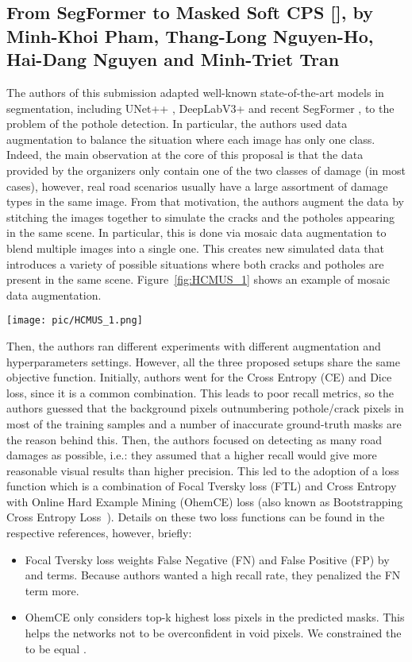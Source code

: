 \documentclass[twocolumn]{article}
\begin{document}
\subsection{From SegFormer to Masked Soft CPS [\HCMUS{}], by Minh-Khoi Pham, Thang-Long Nguyen-Ho, Hai-Dang Nguyen and Minh-Triet Tran}
The authors of this submission adapted well-known state-of-the-art models in segmentation, including UNet++ \cite{zhou2018unet++}, DeepLabV3+ \cite{chen2018encoder} and recent SegFormer \cite{xie2021segformer}, to the problem of the pothole detection. In particular, the authors used data augmentation to balance the situation where each image has only one class. Indeed, the main observation at the core of this proposal is that the data provided by the organizers only contain one of the two classes of damage (in most cases), however, real road scenarios usually have a large assortment of damage types in the same image. From that motivation, the authors augment the data by stitching the images together to simulate the cracks and the potholes appearing in the same scene. In particular, this is done via mosaic data augmentation to blend multiple images into a single one. This creates new simulated data that introduces a variety of possible situations where both cracks and potholes are present in the same scene. Figure~\ref{fig:HCMUS_1} shows an example of mosaic data augmentation.

\begin{figure*}[t]
    \centering
    \texttt{[image: pic/HCMUS\_1.png]}
    \caption{An example of the Mosaic Augmentation used in \HCMUS.}
    \label{fig:HCMUS_1}
\end{figure*}

Then, the authors ran different experiments with different augmentation and hyperparameters settings. However, all the three proposed setups share the same objective function. Initially, authors went for the Cross Entropy (CE) and Dice loss, since it is a common combination. This leads to poor recall metrics, so the authors guessed that the background pixels outnumbering pothole/crack pixels in most of the training samples and a number of inaccurate ground-truth masks are the reason behind this. Then, the authors focused on detecting as many road damages as possible, i.e.: they assumed that a higher recall would give more reasonable visual results than higher precision. This led to the adoption of a loss function which is a combination of Focal Tversky loss (FTL) \cite{abraham2019novel} and Cross Entropy with Online Hard Example Mining (OhemCE) loss (also known as Bootstrapping Cross Entropy Loss~\cite{OhemCE}). Details on these two loss functions can be found in the respective references, however, briefly: 
\begin{itemize}
\item Focal Tversky loss weights False Negative (FN) and False Positive (FP) by  and  terms. Because authors wanted a high recall rate, they penalized the FN term more.
\item OhemCE only considers top-k highest loss pixels in the predicted masks. This helps the networks not to be overconfident in void pixels. We constrained the  to be equal .
\end{itemize} 
\end{document}
